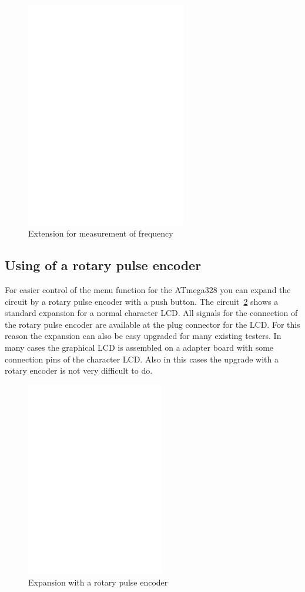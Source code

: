 \begin{figure}[H]
\centering
\includegraphics[width=7cm]{../FIG/Frequency_addon.eps}
\caption{Extension for measurement of frequency}
\label{fig:FreqMes}
\end{figure}

\subsection{Using of a rotary pulse encoder}

For easier control of the menu function for the ATmega328 you can expand the circuit 
by a rotary pulse encoder with a push button.
The circuit~\ref{fig:RotExt} shows a standard expansion for a normal character LCD.
All signals for the connection of the rotary pulse encoder are available at the plug connector
for the LCD. For this reason the expansion can also be easy upgraded for many existing testers.
In many cases the graphical LCD is assembled on a adapter board with some connection pins
of the character LCD. Also in this cases the upgrade with a rotary encoder is not very difficult to do.

\begin{figure}[H]
\centering
\includegraphics[width=6cm]{../FIG/rotary_extension.eps}
\caption{Expansion with a rotary pulse encoder}
\label{fig:RotExt}
\end{figure}

